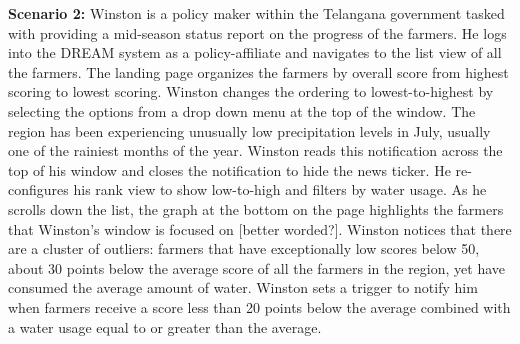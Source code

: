 \begin{flushleft}
\textbf{Scenario 2:} 
Winston is a policy maker within the Telangana government tasked with providing a mid-season status report on the progress of the farmers. He logs into the DREAM system as a policy-affiliate and navigates to the list view of all the farmers. The landing page organizes the farmers by overall score from highest scoring to lowest scoring. Winston changes the ordering to lowest-to-highest by selecting the options from a drop down menu at the top of the window. The region has been experiencing unusually low precipitation levels in July, usually one of the rainiest months of the year. Winston reads this notification across the top of his window and closes the notification to hide the news ticker. He re-configures his rank view to show low-to-high and filters by water usage. As he scrolls down the list, the graph at the bottom on the page highlights the farmers that Winston's window is focused on [better worded?]. Winston notices that there are a cluster of outliers: farmers that have exceptionally low scores below 50, about 30 points below the average score of all the farmers in the region, yet have consumed the average amount of water. Winston sets a trigger to notify him when farmers receive a score less than 20 points below the average combined with a water usage equal to or greater than the average. 
\end{flushleft}
